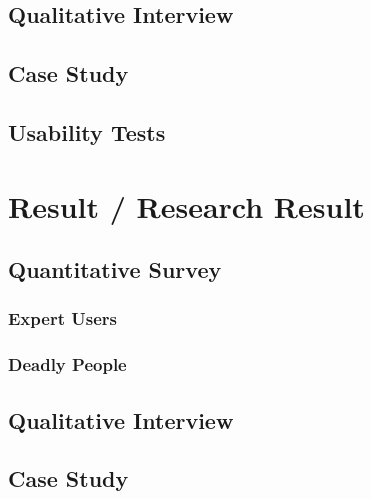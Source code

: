 \documentclass[a4paper,11pt,twoside]{report}
\begin{document}
\section{Qualitative Interview}

\section{Case Study}

\section{Usability Tests}


\chapter{Result / Research Result}

\section{Quantitative Survey}
		
\subsection{Expert Users}

			
\subsection{Deadly People}
			
\section{Qualitative Interview}
	        
\section{Case Study}
	        
\end{document}
